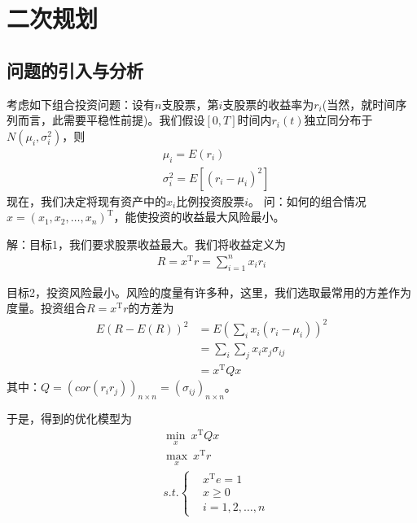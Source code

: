 % 
\chapter{二次规划}

\section{问题的引入与分析}
    \label{sec:二次规划引例}
    \par
    考虑如下组合投资问题：设有$n$支股票，第$i$支股票的收益率为$r_i$(当然，就时间序列而言，此需要平稳性前提)。我们假设$[0,T]$时间内$r_i(t)$独立同分布于$N({\mu}_i,{\sigma}_i^2)$，则
    \begin{align*}
    &{\mu}_i = E(r_i)\\
    &{\sigma}_i^2=E[(r_i-{\mu}_i)^2]
    \end{align*}
    现在，我们决定将现有资产中的$x_i$比例投资股票$i$。
    问：如何的组合情况$x=(x_1,x_2,\ldots,x_n)^\mathrm{T} $，能使投资的收益最大风险最小。
    \par
    解：目标1，我们要求股票收益最大。我们将收益定义为
    \begin{align*}
    R=x^\mathrm{T} r=\mathop{\sum}\limits_{i=1}^n x_ir_i
    \end{align*}
    \par
    目标2，投资风险最小。风险的度量有许多种，这里，我们选取最常用的方差作为度量。投资组合$R=x^\mathrm{T} r$的方差为
    \begin{align*}
    E(R-E(R))^2&=E \left( \mathop{\sum}\limits_{i} x_i(r_i-{\mu}_i) \right) ^2\\
    &=\mathop{\sum}\limits_{i}\mathop{\sum}\limits_{j}x_ix_j{\sigma}_{ij}\\
    &=x^\mathrm{T} Qx
    \end{align*}
    其中：${Q}=(cor(r_ir_j))_{n\times n}=(\sigma_{ij})_{n\times n}$。
    \par
    于是，得到的优化模型为
    \begin{align*}
    &\mathop {\min}\limits_x\  x^\mathrm{T} Qx\\
    &\mathop {\max}\limits_x\  x^\mathrm{T} r\\
    &s.t.\left\{
    \begin{aligned}
    &x^\mathrm{T} e=1\\
    &x \geqslant 0\\
    &i=1,2,\ldots,n
    \end{aligned}
    \right.
    \end{align*}
